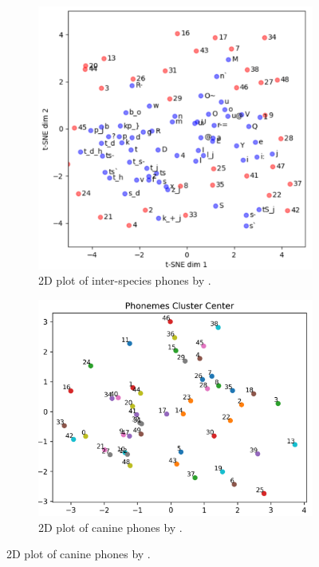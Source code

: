 \begin{figure}[th]
	\centering
	\begin{subfigure}[b]{0.3\linewidth}
		\centering
		\includegraphics[width=0.95\linewidth]{images/masato.png}
		\caption{2D plot of inter-species phones by \citet{hagiwara2024ispa}.}
		\label{fig:masato}
	\end{subfigure}\quad
	\begin{subfigure}[b]{0.3\linewidth}
		\centering
		\includegraphics[width=0.95\linewidth]{images/li.png}
		\caption{2D plot of canine phones by \citet{li2024phonetic}.}

\end{subfigure}
\end{figure}
